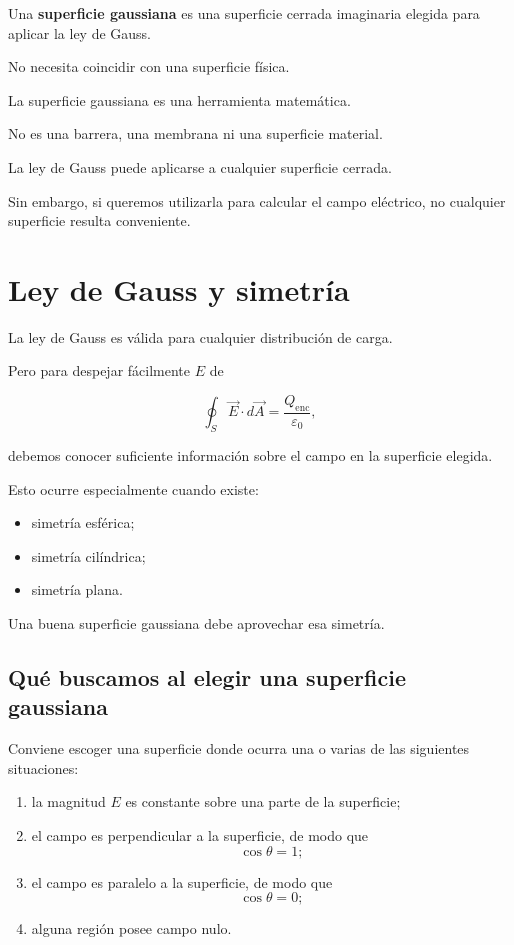 Una \textbf{superficie gaussiana} es una superficie cerrada imaginaria elegida para
aplicar la ley de Gauss.

No necesita coincidir con una superficie física.

\begin{idea}

La superficie gaussiana es una herramienta matemática.

No es una barrera, una membrana ni una superficie material.

\end{idea}

La ley de Gauss puede aplicarse a cualquier superficie cerrada.

Sin embargo, si queremos utilizarla para calcular el campo eléctrico, no cualquier
superficie resulta conveniente.


\section{Ley de Gauss y simetría}

La ley de Gauss es válida para cualquier distribución de carga.

Pero para despejar fácilmente \(E\) de

\[
\oint_S\vec E\cdot d\vec A
=
\frac{Q_{\text{enc}}}{\varepsilon_0},
\]

debemos conocer suficiente información sobre el campo en la superficie elegida.

Esto ocurre especialmente cuando existe:

\begin{itemize}
    \item simetría esférica;
    \item simetría cilíndrica;
    \item simetría plana.
\end{itemize}

Una buena superficie gaussiana debe aprovechar esa simetría.


\subsection{Qué buscamos al elegir una superficie gaussiana}

Conviene escoger una superficie donde ocurra una o varias de las siguientes situaciones:

\begin{enumerate}
    \item la magnitud \(E\) es constante sobre una parte de la superficie;
    \item el campo es perpendicular a la superficie, de modo que
    \[
    \cos\theta=1;
    \]
    \item el campo es paralelo a la superficie, de modo que
    \[
    \cos\theta=0;
    \]
    \item alguna región posee campo nulo.
\end{enumerate}

